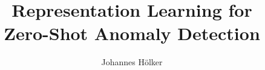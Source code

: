 \title{Representation Learning for \\Zero-Shot Anomaly Detection}
%
%
\author{Johannes Hölker} %
%
%
